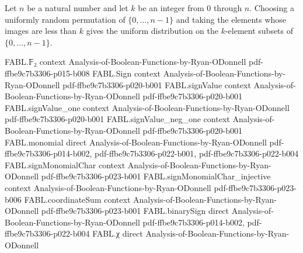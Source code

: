 \begin{theorem}
\label{FABL.maximalPathLayerPMF_eq_uniformLayer}
\leanok
{}
Let $n$ be a natural number and let $k$ be an integer from $0$ through $n$. Choosing a
uniformly random permutation of $\{0,\ldots,n-1\}$ and taking the elements whose images
are less than $k$ gives the uniform distribution on the $k$-element subsets of
$\{0,\ldots,n-1\}$.
\end{theorem}

\begin{theorem}
\label{FABL.uniformMaximalPathPointPMF_eq_shapleySubsetPMF}
\leanok
{}
\proofstep
  {FABL.𝔽₂}
  {context}
  {Analysis-of-Boolean-Functions-by-Ryan-ODonnell}
  {pdf-ffbe9c7b3306-p015-b008}
\proofstep
  {FABL.Sign}
  {context}
  {Analysis-of-Boolean-Functions-by-Ryan-ODonnell}
  {pdf-ffbe9c7b3306-p020-b001}
\proofstep
  {FABL.signValue}
  {context}
  {Analysis-of-Boolean-Functions-by-Ryan-ODonnell}
  {pdf-ffbe9c7b3306-p020-b001}
\proofstep
  {FABL.signValue_one}
  {context}
  {Analysis-of-Boolean-Functions-by-Ryan-ODonnell}
  {pdf-ffbe9c7b3306-p020-b001}
\proofstep
  {FABL.signValue_neg_one}
  {context}
  {Analysis-of-Boolean-Functions-by-Ryan-ODonnell}
  {pdf-ffbe9c7b3306-p020-b001}
\proofstep
  {FABL.monomial}
  {direct}
  {Analysis-of-Boolean-Functions-by-Ryan-ODonnell}
  {pdf-ffbe9c7b3306-p014-b002,
    pdf-ffbe9c7b3306-p022-b001,
    pdf-ffbe9c7b3306-p022-b004}
\proofstep
  {FABL.signMonomialChar}
  {context}
  {Analysis-of-Boolean-Functions-by-Ryan-ODonnell}
  {pdf-ffbe9c7b3306-p023-b001}
\proofstep
  {FABL.signMonomialChar_injective}
  {context}
  {Analysis-of-Boolean-Functions-by-Ryan-ODonnell}
  {pdf-ffbe9c7b3306-p023-b006}
\proofstep
  {FABL.coordinateSum}
  {context}
  {Analysis-of-Boolean-Functions-by-Ryan-ODonnell}
  {pdf-ffbe9c7b3306-p023-b001}
\proofstep
  {FABL.binarySign}
  {direct}
  {Analysis-of-Boolean-Functions-by-Ryan-ODonnell}
  {pdf-ffbe9c7b3306-p014-b002,
    pdf-ffbe9c7b3306-p022-b004}
\proofstep
  {FABL.χ}
  {direct}
  {Analysis-of-Boolean-Functions-by-Ryan-ODonnell}

\end{theorem}
